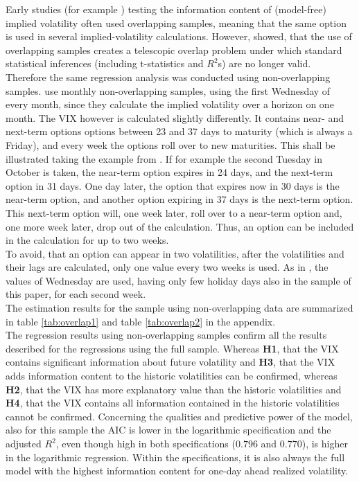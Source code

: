 Early studies (for example \textcite{canina1993}) testing the information content of (model-free) implied volatility often used overlapping samples, meaning that the same option is used in several implied-volatility calculations. However, \textcite{christensen2001} showed, that the use of overlapping samples creates a telescopic overlap problem under which standard statistical inferences (including t-statistics and $R^{2}$s) are no longer valid.\\
Therefore the same regression analysis was conducted using non-overlapping samples. \textcite{jiang2003} use monthly non-overlapping samples, using the first Wednesday of every month, since they calculate the implied volatility over a horizon on one month. The VIX however is calculated slightly differently. It contains near- and next-term options options between 23 and 37 days to maturity (which is always a Friday), and every week the options roll over to new maturities. This shall be illustrated taking the example from \textcite{exchange2009}. If for example the second Tuesday in October is taken, the near-term option expires in 24 days, and the next-term option in 31 days. One day later, the option that expires now in 30 days is the near-term option, and another option expiring in 37 days is the next-term option. This next-term option will, one week later, roll over to a near-term option and, one more week later, drop out of the calculation. Thus, an option can be included in the calculation for up to two weeks. \\
To avoid, that an option can appear in two volatilities, after the volatilities and their lags are calculated, only one value every two weeks is used. As in \textcite{jiang2003}, the values of Wednesday are used, having only few holiday days also in the sample of this paper, for each second week.\\
The estimation results for the sample using non-overlapping data are summarized in table \ref{tab:overlap1} and table \ref{tab:overlap2} in the appendix.\\
The regression results using non-overlapping samples confirm all the results described for the regressions using the full sample. Whereas \textbf{\ac{H1}}, that the VIX contains significant information about future volatility and \textbf{\ac{H3}}, that the VIX adds information content to the historic volatilities can be confirmed, whereas \textbf{\ac{H2}}, that the VIX has more explanatory value than the historic volatilities and \textbf{\ac{H4}}, that the VIX contains all information contained in the historic volatilities cannot be confirmed. Concerning the qualities and predictive power of the model, also for this sample the AIC is lower in the logarithmic specification and the adjusted $R^{2}$, even though high in both specifications ($0.796$ and $0.770$), is higher in the logarithmic regression. Within the specifications, it is also always the full model with the highest information content for one-day ahead realized volatility.\\
